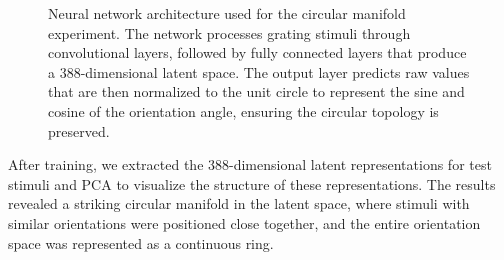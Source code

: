 \documentclass[11pt,a4paper]{article}
\begin{document}
\begin{figure}
\begin{tikzpicture}
    \end{tikzpicture}
    \caption{Neural network architecture used for the circular manifold experiment. The network processes grating stimuli through convolutional layers, followed by fully connected layers that produce a 388-dimensional latent space. The output layer predicts raw values that are then normalized to the unit circle to represent the sine and cosine of the orientation angle, ensuring the circular topology is preserved.}
\end{figure}

After training, we extracted the 388-dimensional latent representations for test stimuli and PCA to visualize the structure of these representations. The results revealed a striking circular manifold in the latent space, where stimuli with similar orientations were positioned close together, and the entire orientation space was represented as a continuous ring.
\end{document}
